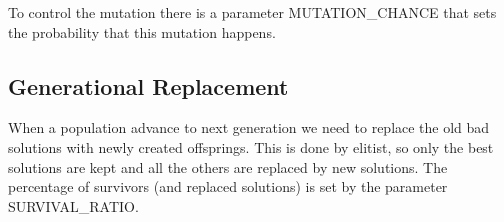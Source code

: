 		To control the mutation there is a parameter MUTATION\_CHANCE that sets the probability that this mutation happens.
		
	\subsection{Generational Replacement}
		When a population advance to next generation we need to replace the old bad solutions with newly created offsprings. This is done by elitist, so only the best solutions are kept and all the others are replaced by new solutions. The percentage of survivors (and replaced solutions) is set by the parameter SURVIVAL\_RATIO.
